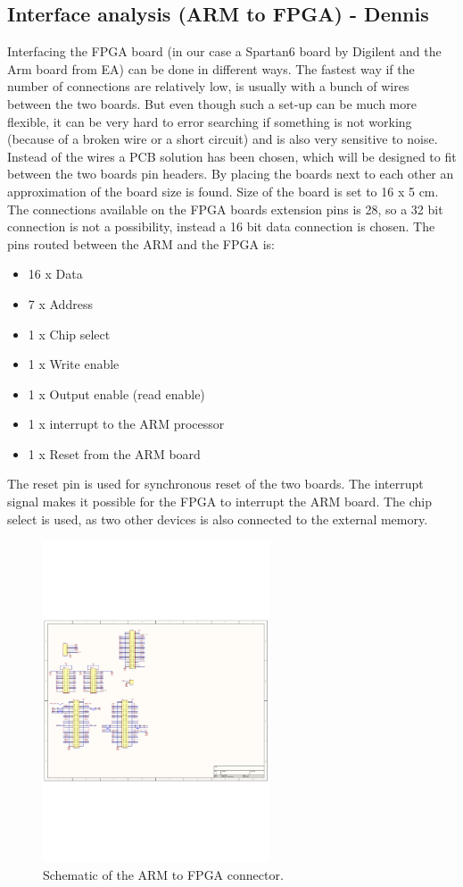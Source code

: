 \subsection{Interface analysis (ARM to FPGA) - Dennis}
Interfacing the FPGA board (in our case a Spartan6 board by Digilent and the Arm board from EA) can be done in different ways. The fastest way if the number of connections are relatively low, is usually with a bunch of wires between the two boards. But even though such a set-up can be much more flexible, it can be very hard to error searching if something is not working (because of a broken wire or a short circuit) and is also very sensitive to noise. Instead of the wires a PCB solution has been chosen, which will be designed to fit between the two boards pin headers. By placing the boards next to each other an approximation of the board size is found. Size of the board is set to 16 x 5 cm. The connections available on the FPGA boards extension pins is 28, so a 32 bit connection is not a possibility, instead a 16 bit data connection is chosen. The pins routed between the ARM and the FPGA is:
\begin{itemize}
	\item 16 x Data
	\item 7 x Address
	\item 1 x Chip select
	\item 1 x Write enable 
	\item 1 x Output enable (read enable)
	\item 1 x interrupt to the ARM processor
	\item 1 x Reset from the ARM board
\end{itemize}
The reset pin is used for synchronous reset of the two boards. The interrupt signal makes it possible for the FPGA to interrupt the ARM board. The chip select is used, as two other devices is also connected to the external memory.
\begin{figure}[H]
	\begin{centering}
		 \includegraphics[width=0.60\textwidth,page=1]{images/dig_to_ea_v0_1}
		\caption{Schematic of the ARM to FPGA connector.}
	\end{centering}
\end{figure}
